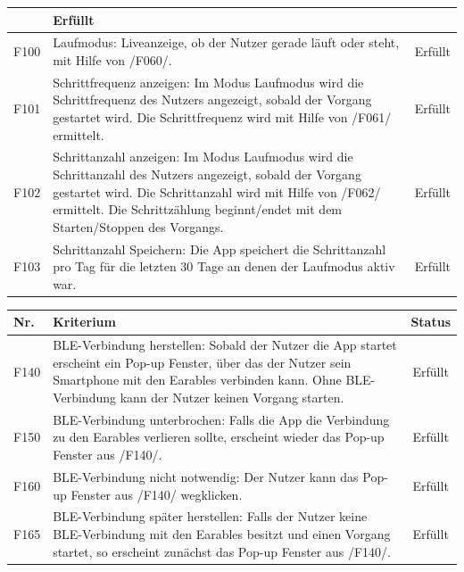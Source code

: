 \documentclass[a4paper,12pt]{article}
\begin{document}
\begin{center}
\begin{tabular}{ |m{1cm}| m{11cm} | c | }
	&    \cellcolor{green!25} Erfüllt 
	\\  \hline   F100 & \textsf{Laufmodus:} Liveanzeige, ob der Nutzer gerade \glqq läuft\grqq{} oder \glqq steht\grqq{}, mit Hilfe von /F060/.
	&    \cellcolor{green!25} Erfüllt 
	\\  \hline   F101 & \textsf {Schrittfrequenz anzeigen:} Im Modus \glqq{}Laufmodus\grqq{} wird die Schrittfrequenz des Nutzers angezeigt, sobald der Vorgang gestartet wird. Die Schrittfrequenz wird mit Hilfe von /F061/ ermittelt.
	&    \cellcolor{green!25} Erfüllt 
	\\  \hline   F102 & \textsf {Schrittanzahl anzeigen:} Im Modus \glqq{}Laufmodus\grqq{} wird die Schrittanzahl des Nutzers angezeigt, sobald der Vorgang gestartet wird. Die Schrittanzahl wird mit Hilfe von /F062/ ermittelt. Die Schrittzählung beginnt/endet mit dem Starten/Stoppen des Vorgangs.
	&    \cellcolor{green!25} Erfüllt 
	\\  \hline   F103 & \textsf{Schrittanzahl Speichern:} Die App speichert die Schrittanzahl pro Tag für die letzten 30 Tage an denen der Laufmodus aktiv war.
	&    \cellcolor{green!25} Erfüllt 
	\\
	\hline
	
   
\end{tabular}
\end{center}
\vspace{1cm}

\begin{center}
	\begin{tabular}{ |m{1cm}| m{11cm} | c | } 
		\hline
		\textbf{Nr.} & \textbf{Kriterium} & \textbf{Status}

	\\  \hline   F140 & \textsf{BLE-Verbindung herstellen:} Sobald der Nutzer die App startet erscheint ein Pop-up Fenster, über das der Nutzer sein Smartphone mit den Earables verbinden kann. Ohne BLE-Verbindung kann der Nutzer keinen Vorgang starten.
	&    \cellcolor{green!25} Erfüllt 
	\\  \hline   F150 & \textsf{BLE-Verbindung unterbrochen:} Falls die App die Verbindung zu den Earables verlieren sollte, erscheint wieder das Pop-up Fenster aus /F140/.
	&    \cellcolor{green!25} Erfüllt 
	\\  \hline   F160 & \textsf{BLE-Verbindung nicht notwendig:} Der Nutzer kann das Pop-up Fenster aus /F140/ wegklicken.
	&    \cellcolor{green!25} Erfüllt 
	\\  \hline   F165 & \textsf{BLE-Verbindung später herstellen:} Falls der Nutzer keine BLE-Verbindung mit den Earables besitzt und einen Vorgang startet, so erscheint zunächst das Pop-up Fenster aus /F140/.
	&    \cellcolor{green!25} Erfüllt 
	\\
	\hline
   
\end{tabular}
\end{center}
\vspace{1cm}
\end{document}
